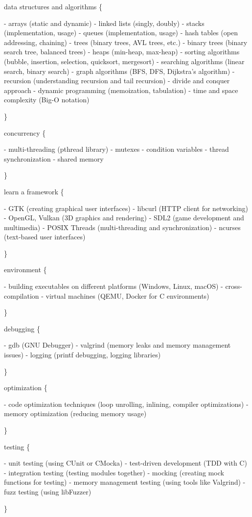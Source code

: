 data structures and algorithms \{ \begin{DoxyVerb}- arrays (static and dynamic)
- linked lists (singly, doubly)
- stacks (implementation, usage)
- queues (implementation, usage)
- hash tables (open addressing, chaining)
- trees (binary trees, AVL trees, etc.)
- binary trees (binary search tree, balanced trees)
- heaps (min-heap, max-heap)
- sorting algorithms (bubble, insertion, selection, quicksort, mergesort)
- searching algorithms (linear search, binary search)
- graph algorithms (BFS, DFS, Dijkstra’s algorithm)
- recursion (understanding recursion and tail recursion)
- divide and conquer approach
- dynamic programming (memoization, tabulation)
- time and space complexity (Big-O notation)
\end{DoxyVerb}
 \}

concurrency \{ \begin{DoxyVerb}- multi-threading (pthread library)
- mutexes
- condition variables
- thread synchronization
- shared memory
\end{DoxyVerb}
 \}

learn a framework \{ \begin{DoxyVerb}- GTK (creating graphical user interfaces)
- libcurl (HTTP client for networking)
- OpenGL, Vulkan (3D graphics and rendering)
- SDL2 (game development and multimedia)
- POSIX Threads (multi-threading and synchronization)
- ncurses (text-based user interfaces)
\end{DoxyVerb}
 \}

environment \{ \begin{DoxyVerb}- building executables on different platforms (Windows, Linux, macOS)
- cross-compilation
- virtual machines (QEMU, Docker for C environments)
\end{DoxyVerb}
 \}

debugging \{ \begin{DoxyVerb}- gdb (GNU Debugger)
- valgrind (memory leaks and memory management issues)
- logging (printf debugging, logging libraries)
\end{DoxyVerb}
 \}

optimization \{ \begin{DoxyVerb}- code optimization techniques (loop unrolling, inlining, compiler optimizations)
- memory optimization (reducing memory usage)
\end{DoxyVerb}
 \}

testing \{ \begin{DoxyVerb}- unit testing (using CUnit or CMocka)
- test-driven development (TDD with C)
- integration testing (testing modules together)
- mocking (creating mock functions for testing)
- memory management testing (using tools like Valgrind)
- fuzz testing (using libFuzzer)
\end{DoxyVerb}
 \}

